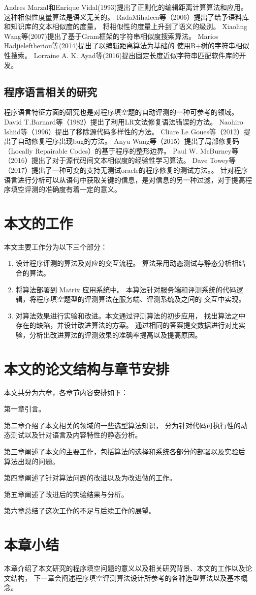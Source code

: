 Andres Marzal和Enrique Vidal(1993)提出了正则化的编辑距离计算算法和应用\cite{Marzal1993Computation}。
这种相似性度量算法是语义无关的。
RadaMihalcea等（2006）提出了给予语料库和知识库的文本相似度的度量，
将相似性的度量上升到了语义的级别\cite{Mihalcea2006Corpus}。
Xiaoling Wang等(2007)提出了基于Gram框架的字符串相似度搜索算法\cite{DBLP:journals/tkde/HuZWZ15_20}。
Marios Hadjieleftheriou等(2014)提出了以编辑距离算法为基础的
使用B+树的字符串相似性搜索\cite{lu2014efficiently_19}。
Lorraine A. K. Ayad等(2016)提出固定长度近似字符串匹配软件库的开发\cite{DBLP:journals/bmcbi/AyadPR16_18}。
\subsection{程序语言相关的研究}
程序语言特征方面的研究也是对程序填空题的自动评测的一种可参考的领域。
David T.Barnard等（1982）提出了利用LR文法修复语法错误的方法\cite{Barnard1982Hierarchic}。
Naohiro Ishiid等（1996）提出了移除源代码多样性的方法\cite{Hattori1996A}。
Cliare Le Goues等（2012）提出了自动修复程序出现bug的方法\cite{Goues2012A}。
Anyu Wang等（2015）提出了局部修复码（Locally Repairable Codes）的基于程序的整形边界\cite{DBLP:journals/tit/WangZ15_22}。
Paul W. McBurney等（2016）提出了对于源代码间文本相似度的经验性学习算法\cite{DBLP:journals/ese/McBurneyM16_23}。
Dave Towey等（2017）提出了一种可变的支持无测试oracle的程序修复的测试方法。\cite{DBLP:journals/jss/JiangCKTD17_21}。
针对程序语言进行分析可以从语句中获取关键的信息，是对信息的另一种过滤，对于提高程序填空评测的准确度有着一定的意义。
\section{本文的工作}
本文主要工作分为以下三个部分：
\begin{enumerate}
  \item 设计程序评测的算法及对应的交互流程。
  算法采用动态测试与静态分析相结合的算法。
  \item 将算法部署到 Matrix 应用系统中。
  本算法针对服务端和评测系统的代码逻辑，将程序填空题型的评测算法在服务端、评测系统及之间的
  交互中实现。
  \item 对算法效果进行实验和改进。本文通过评测算法的初步应用，
  找出算法之中存在的缺陷，并设计改进算法的方案。
  通过相同的答案提交数据进行对比实验，分析出改进算法的评测效果的准确率提高以及提高原因。
\end{enumerate}
\section{本文的论文结构与章节安排}
\label{sec:arrangement}
本文共分为六章，各章节内容安排如下：

第一章引言。

第二章介绍了本文相关的领域的一些选型算法知识，
分为针对代码可执行性的动态测试以及针对语言及内容特性的静态分析。

第三章阐述了本文的主要工作，包括算法的选择和系统各部分的部署以及实验后
算法出现的问题。

第四章阐述了针对算法问题的改进以及为改进做的工作。

第五章阐述了改进后的实验结果与分析。

第六章总结了这次工作的不足与后续工作的展望。
\section{本章小结}
本章介绍了本文研究的程序填空问题的意义以及相关研究背景、本文的工作以及论文结构，
下一章会阐述程序填空评测算法设计所参考的各种选型算法以及基本概念。

\clearpage
